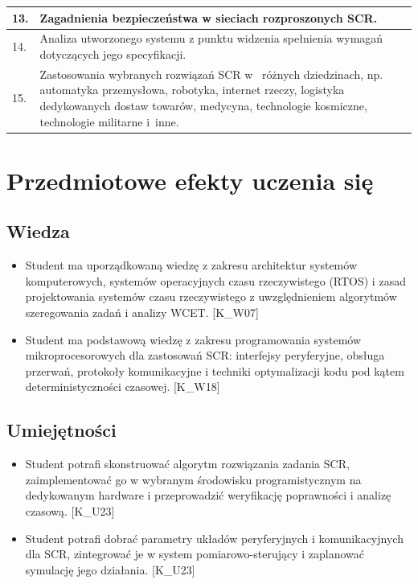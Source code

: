 \documentclass[12pt, a4paper]{article}
\begin{document}
\begin{longtable}{|p{1.5cm}|p{6.5cm}|p{6.5cm}|}
  \hline
  13. & Zagadnienia bezpieczeństwa w sieciach rozproszonych SCR. &  \\
  \hline
  14. & Analiza utworzonego systemu z punktu widzenia spełnienia wymagań dotyczących jego specyfikacji. &  \\
  \hline
  15. & Zastosowania wybranych rozwiązań SCR w  różnych dziedzinach, np. automatyka przemysłowa, robotyka, internet rzeczy, logistyka dedykowanych dostaw towarów, medycyna, technologie kosmiczne, technologie militarne i inne. &  \\
  \hline
\end{longtable}

\section{Przedmiotowe efekty uczenia się}

\subsection*{Wiedza}
\begin{itemize}
  \item Student ma uporządkowaną wiedzę z zakresu architektur systemów komputerowych, systemów operacyjnych czasu rzeczywistego (RTOS) i zasad projektowania systemów czasu rzeczywistego z uwzględnieniem algorytmów szeregowania zadań i analizy WCET. [K\_W07]
  \item Student ma podstawową wiedzę z zakresu programowania systemów mikroprocesorowych dla zastosowań SCR: interfejsy peryferyjne, obsługa przerwań, protokoły komunikacyjne i techniki optymalizacji kodu pod kątem deterministyczności czasowej. [K\_W18]
\end{itemize}

\subsection*{Umiejętności}
\begin{itemize}
  \item Student potrafi skonstruować algorytm rozwiązania zadania SCR, zaimplementować go w wybranym środowisku programistycznym na dedykowanym hardware i przeprowadzić weryfikację poprawności i analizę czasową. [K\_U23]
  \item Student potrafi dobrać parametry układów peryferyjnych i komunikacyjnych dla SCR, zintegrować je w system pomiarowo-sterujący i zaplanować symulację jego działania. [K\_U23]
\end{itemize}
\end{document}
